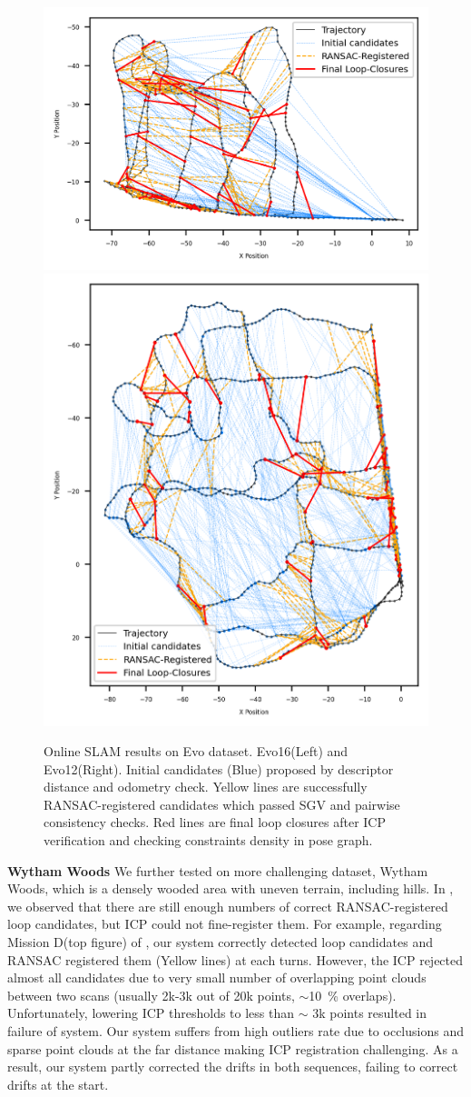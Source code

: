 \begin{figure}[htbp]
  \centering
  \includegraphics[width=0.54\columnwidth]{pics/exp_2_1_evo16_online2.png}
  \includegraphics[width=0.44\columnwidth]{pics/exp_2_1_evo12_online.png}
  \caption{Online SLAM results on Evo dataset. Evo16(Left) and Evo12(Right). Initial candidates (Blue) proposed by descriptor distance and odometry check. Yellow lines are successfully RANSAC-registered candidates which passed SGV and pairwise consistency checks. Red lines are final loop closures after ICP verification and checking constraints density in pose graph.}
  \label{fig:exp_2_1_evo_online}
\end{figure}
\newline
\textbf{Wytham Woods}\hspace{0.5em} We further tested on more challenging dataset, Wytham Woods, which is a densely wooded area with uneven terrain, including hills. In , we observed that there are still enough numbers of correct RANSAC-registered loop candidates, but ICP could not fine-register them. For example, regarding Mission D(top figure) of , our system correctly detected loop candidates and RANSAC registered them (Yellow lines) at each turns. However, the ICP rejected almost all candidates due to very small number of overlapping point clouds between two scans (usually 2k-3k out of 20k points, $\sim$\SI{10}{\percent} overlaps). Unfortunately, lowering ICP thresholds to less than $\sim$ 3k points resulted in failure of system. Our system suffers from high outliers rate due to occlusions and sparse point clouds at the far distance making ICP registration challenging. As a result, our system partly corrected the drifts in both sequences, failing to correct drifts at the start. 
